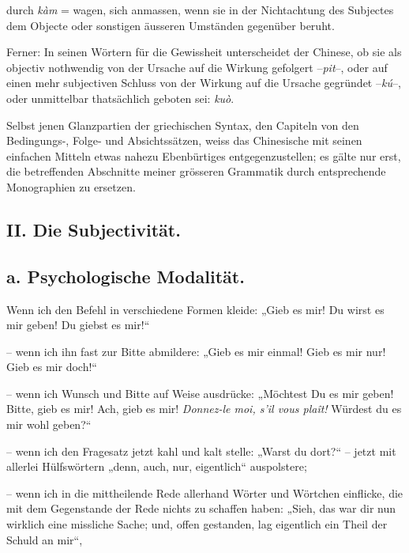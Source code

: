 durch \textit{kàm} = wagen, sich anmassen, wenn sie in der Nichtachtung des Subjectes dem Objecte oder sonstigen äusseren Umständen gegenüber beruht.

Ferner: In seinen Wörtern für die Gewissheit unterscheidet der Chinese, ob sie als objectiv nothwendig von der Ursache auf die Wirkung gefolgert –\textit{pit}–, oder auf einen mehr subjectiven Schluss von der Wirkung auf die Ursache gegründet –\textit{kú}–, oder unmittelbar thatsächlich geboten sei: \textit{kuò}.

Selbst jenen Glanzpartien der griechischen Syntax, den Capiteln von den Bedin\-\mbox{gungs-,} Folge- und Absichtssätzen, weiss das Chinesische mit seinen einfachen Mitteln etwas nahezu Ebenbürtiges entgegenzustellen; es gälte nur erst, \label{sp.472} die betreffenden Abschnitte meiner grösseren Grammatik durch entsprechende Monographien zu ersetzen.

\subsection*{II. Die Subjectivität.}\label{IV.IV.IIa}
\subsection*{a. Psychologische Modalität.}

Wenn ich den Befehl in verschiedene Formen kleide: „Gieb es mir! Du wirst es mir geben! Du giebst es mir!“

– wenn ich ihn fast zur Bitte abmildere: „Gieb es mir einmal! Gieb es mir nur! Gieb es mir doch!“

– wenn ich Wunsch und Bitte auf  Weise ausdrücke: „Möchtest Du es mir geben! Bitte, gieb es mir! Ach, gieb es mir! \textit{Donnez-le moi, s’il vous plaît!} Würdest du es mir wohl geben?“

– wenn ich den Fragesatz jetzt kahl und kalt stelle: „Warst du dort?“ – jetzt mit allerlei Hülfswörtern „denn, auch, nur, eigentlich“ auspolstere;

– wenn ich in die mittheilende Rede allerhand Wörter und Wörtchen einflicke, die mit dem Gegenstande der Rede nichts zu schaffen haben: „Sieh, das war dir nun wirklich eine missliche Sache; und, offen gestanden, lag eigentlich ein Theil der Schuld an mir“,

